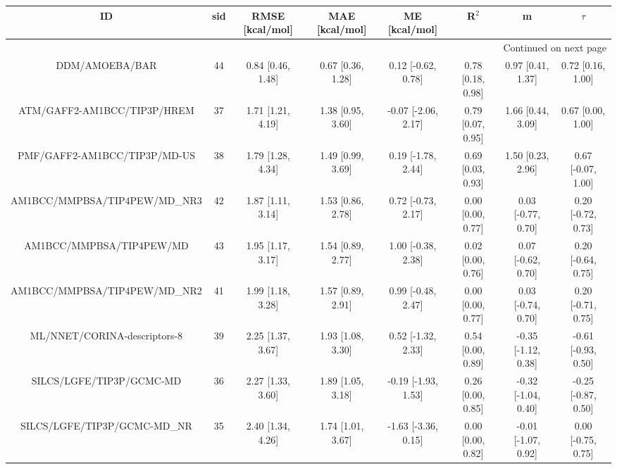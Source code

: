 \documentclass[8pt]{article}
\begin{document}
\begin{center}
\begin{footnotesize}
\begin{longtable}{|cccccccc|}
\toprule
                                   ID & sid &     RMSE [kcal/mol] &      MAE [kcal/mol] &         ME [kcal/mol] &              R$^2$ &                    m &               $\tau$ \\
\midrule
\endhead
\midrule
\multicolumn{8}{r}{{Continued on next page}} \\
\midrule
\endfoot

\bottomrule
\endlastfoot
                       DDM/AMOEBA/BAR &  44 &   0.84 [0.46, 1.48] &   0.67 [0.36, 1.28] &    0.12 [-0.62, 0.78] &  0.78 [0.18, 0.98] &    0.97 [0.41, 1.37] &    0.72 [0.16, 1.00] \\
          ATM/GAFF2-AM1BCC/TIP3P/HREM &  37 &   1.71 [1.21, 4.19] &   1.38 [0.95, 3.60] &   -0.07 [-2.06, 2.17] &  0.79 [0.07, 0.95] &    1.66 [0.44, 3.09] &    0.67 [0.00, 1.00] \\
         PMF/GAFF2-AM1BCC/TIP3P/MD-US &  38 &   1.79 [1.28, 4.34] &   1.49 [0.99, 3.69] &    0.19 [-1.78, 2.44] &  0.69 [0.03, 0.93] &    1.50 [0.23, 2.96] &   0.67 [-0.07, 1.00] \\
        AM1BCC/MMPBSA/TIP4PEW/MD\_NR3 &  42 &   1.87 [1.11, 3.14] &   1.53 [0.86, 2.78] &    0.72 [-0.73, 2.17] &  0.00 [0.00, 0.77] &   0.03 [-0.77, 0.70] &   0.20 [-0.72, 0.73] \\
             AM1BCC/MMPBSA/TIP4PEW/MD &  43 &   1.95 [1.17, 3.17] &   1.54 [0.89, 2.77] &    1.00 [-0.38, 2.38] &  0.02 [0.00, 0.76] &   0.07 [-0.62, 0.70] &   0.20 [-0.64, 0.75] \\
        AM1BCC/MMPBSA/TIP4PEW/MD\_NR2 &  41 &   1.99 [1.18, 3.28] &   1.57 [0.89, 2.91] &    0.99 [-0.48, 2.47] &  0.00 [0.00, 0.77] &   0.03 [-0.74, 0.70] &   0.20 [-0.71, 0.75] \\
         ML/NNET/CORINA-descriptors-8 &  39 &   2.25 [1.37, 3.67] &   1.93 [1.08, 3.30] &    0.52 [-1.32, 2.33] &  0.54 [0.00, 0.89] &  -0.35 [-1.12, 0.38] &  -0.61 [-0.93, 0.50] \\
             SILCS/LGFE/TIP3P/GCMC-MD &  36 &   2.27 [1.33, 3.60] &   1.89 [1.05, 3.18] &   -0.19 [-1.93, 1.53] &  0.26 [0.00, 0.85] &  -0.32 [-1.04, 0.40] &  -0.25 [-0.87, 0.50] \\
         SILCS/LGFE/TIP3P/GCMC-MD\_NR &  35 &   2.40 [1.34, 4.26] &   1.74 [1.01, 3.67] &   -1.63 [-3.36, 0.15] &  0.00 [0.00, 0.82] &  -0.01 [-1.07, 0.92] &   0.00 [-0.75, 0.75] \\

\end{longtable}
\end{footnotesize}
\end{center}
\end{document}
